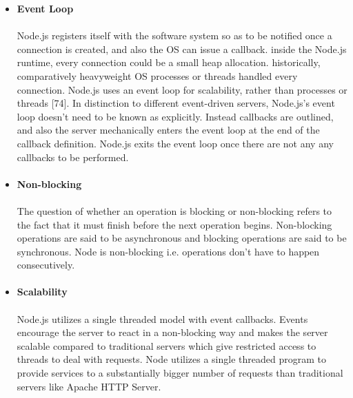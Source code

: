 \documentclass[../thesis.tex]{subfiles}
\begin{document}
\begin{itemize}
    \paragraph{}
    \item \textbf{Event Loop}
    \paragraph{}
    Node.js registers itself with the software system so as to be notified once a connection is created, and also the OS can issue a callback. inside the Node.js runtime, every connection could be a small heap allocation. historically, comparatively heavyweight OS processes or threads handled every connection. Node.js uses an event loop for scalability, rather than processes or threads [74]. In distinction to different event-driven servers, Node.js's event loop doesn't need to be known as explicitly. Instead callbacks are outlined, and also the server mechanically enters the event loop at the end of the callback definition. Node.js exits the event loop once there are not any any callbacks to be performed.
    \paragraph{}
    \item \textbf{Non-blocking}
    \paragraph{}
    The question of whether an operation is blocking or non-blocking refers to the fact that it must finish before the next operation begins. Non-blocking operations are said to be asynchronous and blocking operations are said to be synchronous. Node is non-blocking i.e. operations don't have to happen consecutively.
    \paragraph{}
    \item \textbf{Scalability}
    \paragraph{}
    Node.js utilizes a single threaded model with event callbacks. Events encourage the server to react in a non-blocking way and makes the server scalable compared to traditional servers which give restricted access to threads to deal with requests. Node utilizes a single threaded program to provide services to a substantially bigger number of requests than traditional servers like Apache HTTP Server.

\end{itemize}
\end{document}
